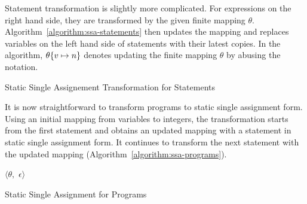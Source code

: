 Statement transformation is slightly more complicated. For
expressions on the right hand side, they are transformed by the given
finite mapping $\theta$. Algorithm~\ref{algorithm:ssa-statements} then
updates the mapping and replaces variables on the left hand side of
statements with their latest copies. In the algorithm, 
$\theta\{{v} \mapsto {n}\}$ denotes updating the finite mapping $\theta$
by abusing the notation. 

\begin{algorithm}
  \begin{algorithmic}[1]
      \EndCase
      \EndCase
    \EndMatch
    \EndFunction
  \end{algorithmic}
  \caption{Static Single Assignement Transformation for Statements}
  \label{algorithm:ssa-statements}
\end{algorithm}

It is now straightforward to transform programs to static single
assignment form. Using an initial mapping from variables to integers,
the transformation starts from the first statement and obtains an
updated mapping with a statement in static single assignment form. It
continues to transform the next statement with the updated mapping
(Algorithm~\ref{algorithm:ssa-programs}). 

\begin{algorithm}
  \begin{algorithmic}[1]
      \Case{$\epsilon$}
        \Return $\langle \theta,$ $\epsilon \rangle$
      \EndCase
      \EndCase
    \EndMatch
    \EndFunction
  \end{algorithmic}
  \caption{Static Single Assignment for Programs}
  \label{algorithm:ssa-programs}
\end{algorithm}



